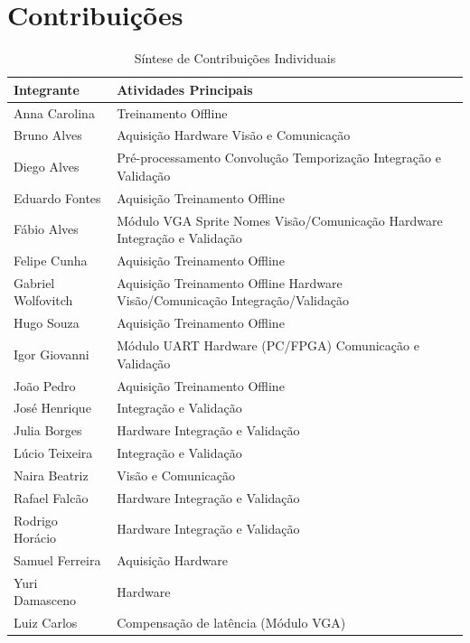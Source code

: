 \chapter{Contribuições}%
\newcommand{\rot}[1]{\rotatebox{90}{\quad #1 \quad}}

\begin{table}[htbp]
\centering
\caption{Síntese de Contribuições Individuais}
\label{tab:contribuicoes_minimalista}
\small
\begin{tabular}{l p{10cm}}
\toprule
\textbf{Integrante} & \textbf{Atividades Principais} \\
\midrule
Anna Carolina & Treinamento Offline \\
Bruno Alves & Aquisição \textbullet{} Hardware \textbullet{} Visão e Comunicação \\
Diego Alves & Pré-processamento \textbullet{} Convolução \textbullet{} Temporização \textbullet{} Integração e Validação \\
Eduardo Fontes & Aquisição \textbullet{} Treinamento Offline \\
Fábio Alves & Módulo VGA \textbullet{} Sprite Nomes \textbullet{} Visão/Comunicação \textbullet{} Hardware \textbullet{} Integração e Validação \\
Felipe Cunha & Aquisição \textbullet{} Treinamento Offline \\
Gabriel Wolfovitch & Aquisição \textbullet{} Treinamento Offline \textbullet{} Hardware \textbullet{} Visão/Comunicação \textbullet{} Integração/Validação \\
Hugo Souza & Aquisição \textbullet{} Treinamento Offline \\
Igor Giovanni & Módulo UART \textbullet{} Hardware (PC/FPGA) \textbullet{} Comunicação e Validação \\
João Pedro & Aquisição \textbullet{} Treinamento Offline \\
José Henrique & Integração e Validação \\
Julia Borges & Hardware \textbullet{} Integração e Validação \\
Lúcio Teixeira & Integração e Validação \\
Naira Beatriz & Visão e Comunicação \\
Rafael Falcão & Hardware \textbullet{} Integração e Validação \\
Rodrigo Horácio & Hardware \textbullet{} Integração e Validação \\
Samuel Ferreira & Aquisição \textbullet{} Hardware \\
Yuri Damasceno & Hardware \\
Luiz Carlos & Compensação de latência (Módulo VGA) \\
\bottomrule
\end{tabular}
\end{table}
